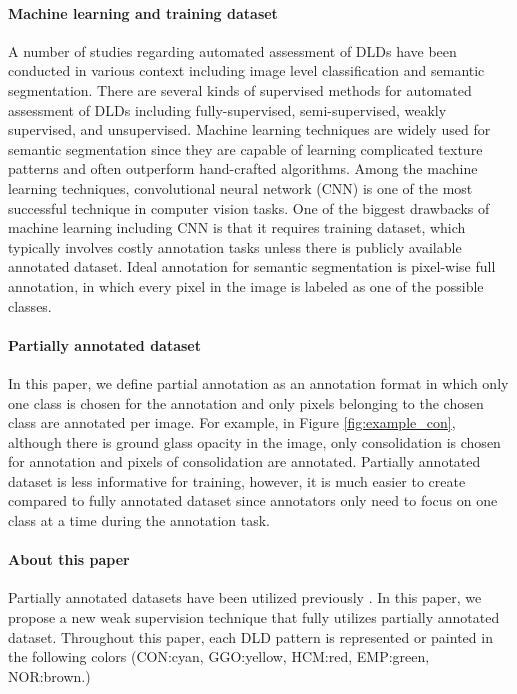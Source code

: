 \documentclass[]{spie}
\begin{document}
\paragraph{Machine learning and training dataset}
A number of studies regarding automated assessment of DLDs have been conducted in various context including image level classification and semantic segmentation.
There are several kinds of supervised methods for automated assessment of DLDs including fully-supervised\cite{Hashimoto2018,gao2018holistic,Negahdar2019}, semi-supervised\cite{Anthimopoulos2019}, weakly supervised\cite{Wang2019}, and unsupervised\cite{Mabu2017}.
Machine learning techniques are widely used for semantic segmentation since they are capable of learning complicated texture patterns and often outperform hand-crafted algorithms.
Among the machine learning techniques, convolutional neural network (CNN) is one of the most  successful technique in computer vision tasks.
One of the biggest drawbacks of machine learning including CNN is that it requires training dataset, which typically involves costly annotation tasks unless there is publicly available annotated dataset.
Ideal annotation for semantic segmentation is pixel-wise full annotation, in which every pixel in the image is labeled as one of the possible classes.

\paragraph{Partially annotated dataset}
In this paper, we define partial annotation as an annotation format in which only one class is chosen for the annotation and only pixels belonging to the chosen class are annotated per image.
For example, in Figure \ref{fig:example_con}, although there is ground glass opacity in the image, only consolidation is chosen for annotation and pixels of consolidation are annotated.
Partially annotated dataset is less informative for training, however, it is much easier to create compared to fully annotated dataset since annotators only need to focus on one class at a time during the annotation task.

\paragraph{About this paper}
Partially annotated datasets have been utilized previously \cite{Dmitriev_2019_CVPR,Kong2019}.
In this paper, we propose a new weak supervision technique that fully utilizes partially annotated dataset.
Throughout this paper, each DLD pattern is represented or painted in the following colors (CON:cyan, GGO:yellow, HCM:red, EMP:green, NOR:brown.)
\end{document}
